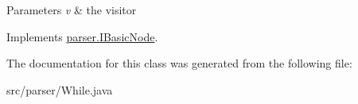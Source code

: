 \begin{DoxyParams}{Parameters}
{\em v} & the visitor \\
\hline
\end{DoxyParams}


Implements \hyperlink{interfaceparser_1_1_i_basic_node_af8790b7076c59e00781ba3d4118757cd}{parser.\+I\+Basic\+Node}.



The documentation for this class was generated from the following file\+:\begin{DoxyCompactItemize}
\item 
src/parser/While.\+java\end{DoxyCompactItemize}
